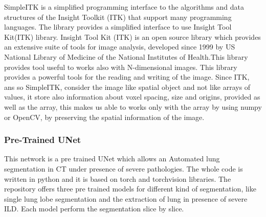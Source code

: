 \documentclass{standalone}
\begin{document}
	SimpleITK is a simplified programming interface to the algorithms and data structures of the Insight Toolkit (ITK) that support many programming languages. The library provides a simplified interface to use Insight Tool Kit(ITK) library. 
	Insight Tool Kit (ITK) is an open source library which provides an extensive suite of tools for image analysis, developed since 1999 by US National Library of Medicine of the National Institutes of Health.This library provides tool useful to works also with N-dimensional images. 
	This library provides a powerful tools for the reading and writing of the image. Since ITK, ans so SimpleITK,  consider the image like spatial object and not like arrays of values, it store also information about voxel spacing, size and origins, provided as well as the array, this makes us able to works only with the array by using numpy or OpenCV, by preserving the spatial information of the image.

	\subsubsection*{Pre-Trained UNet} 
	
	This network is a pre trained UNet which allows an Automated lung segmentation in CT under presence of severe pathologies. The whole code is written in python and it is based on torch and torchvision libraries. The repository offers three pre trained models for different kind of segmentation, like single lung lobe segmentation and the extraction of lung in presence of severe ILD. Each model perform the segmentation slice by slice. 
	
	 
\end{document}
